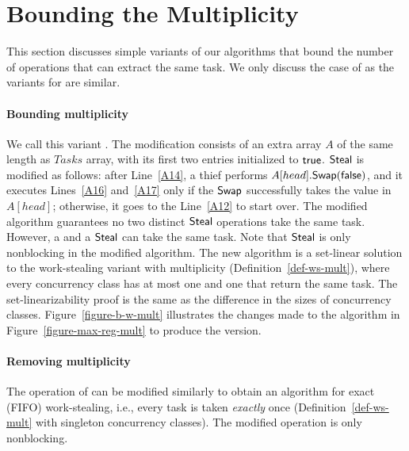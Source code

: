 \section{Bounding the Multiplicity\label{sec-bound-mult}}

This section discusses simple variants of our algorithms that bound the number of operations that can extract the same task.  We only discuss the case of \WFWSM as the variants for \NCWSM are similar.

\paragraph*{\label{par:bounding-multiplicity}Bounding multiplicity}

We call this variant \BNCWSM. The modification consists of an extra array \(A\) of the same length as \(Tasks\) array, with its first two entries initialized to ${\sf true}$.  ${\sf Steal}$ is modified as follows: after Line~\ref{A14}, a thief performs \(A[head].{\sf Swap}({\sf false})\), and it executes Lines~\ref{A16} and~\ref{A17} only if the ${\sf Swap}$ successfully takes the \true value in \(A[head]\); otherwise, it goes to the Line~\ref{A12} to start over.  The modified algorithm guarantees no two distinct ${\sf Steal}$ operations take the same task. However, a \Take and a ${\sf Steal}$ can take the same task.  Note that ${\sf Steal}$ is only nonblocking in the modified algorithm.  The new algorithm is a set-linear solution to the work-stealing variant with multiplicity (Definition~\ref{def-ws-mult}), where every concurrency class has at most one \Take and one \Steal that return the same task. The set-linearizability proof is the same as the difference in the sizes of concurrency classes. Figure~\ref{figure-b-w-mult} illustrates the changes made to the algorithm in Figure~\ref{figure-max-reg-mult} to produce the \BNCWSM version.

\paragraph*{Removing multiplicity}

The \Take operation of \BNBWSM can be modified similarly to obtain an algorithm for exact (FIFO) work-stealing, i.e., every task is taken \emph{exactly} once (Definition~\ref{def-ws-mult} with singleton concurrency classes). The modified \Take operation is only nonblocking.

